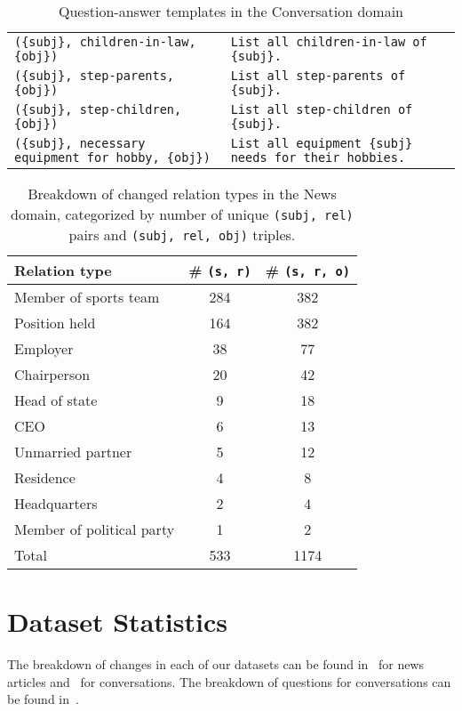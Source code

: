 \begin{table*}[]
\begin{tabular}{p{8cm}p{7cm}}
\multirow{1}{8cm}{
    \texttt{(\{subj\}, children-in-law, \{obj\})}
} & \verb|List all children-in-law of {subj}.| \\
\multirow{1}{8cm}{
    \texttt{(\{subj\}, step-parents, \{obj\})}
} & \verb|List all step-parents of {subj}.| \\
\multirow{1}{8cm}{
    \texttt{(\{subj\}, step-children, \{obj\})}
} & \verb|List all step-children of {subj}.| \\
\multirow{1}{8cm}{
    \texttt{(\{subj\}, necessary equipment for hobby, \{obj\})}
} & \verb|List all equipment {subj} needs for their hobbies.| \\
    \end{tabular}
    \caption{Question-answer templates in the Conversation domain}
    \label{tab:convo_qs_templates}
\end{table*}


\begin{table}[!t]
    \centering
    \footnotesize
    \begin{tabular}{lcc}
    \toprule
       Relation type  & \# \texttt{(s, r)} & \# \texttt{(s, r, o)} \\
       \midrule
       Member of sports team & 284 & 382 \\
       Position held & 164 & 382 \\
       Employer & 38 & 77 \\
       Chairperson & 20 & 42 \\
       Head of state & 9 & 18 \\
       CEO & 6 & 13 \\
       Unmarried partner & 5 & 12 \\
       Residence & 4 & 8 \\
       Headquarters & 2 & 4 \\
       Member of political party & 1 & 2 \\
       \midrule
       Total & 533 & 1174  \\
       \bottomrule
    \end{tabular}
    \caption{Breakdown of changed relation types in the News domain, categorized by number of unique \texttt{(subj, rel)} pairs and \texttt{(subj, rel, obj)} triples.}
    \label{tab:news_relations}
\end{table}


\section{Dataset Statistics}
\label{app:dataset_stats}
The breakdown of changes in each of our datasets can be found in~ for news articles and~ for conversations. The breakdown of questions for conversations can be found in~.



